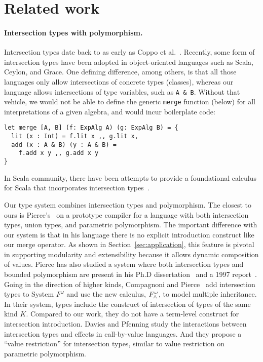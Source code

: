 \section{Related work} \label{sec:related-work}



\paragraph{Intersection types with polymorphism.}

Intersection types date back to as early as Coppo et
al.~\cite{coppo1981functional}. Recently, some form of intersection types have
been adopted in object-oriented languages such as Scala, Ceylon, and Grace. One
defining difference, among others, is that all those languages only allow
intersections of concrete types (classes), whereas our language allows
intersections of type variables, such as \texttt{A \& B}. Without that vehicle,
we would not be able to define the generic \texttt{merge} function (below) for
all interpretations of a given algebra, and would incur boilerplate code:
\begin{verbatim}
let merge [A, B] (f: ExpAlg A) (g: ExpAlg B) = {
  lit (x : Int) = f.lit x ,, g.lit x,
  add (x : A & B) (y : A & B) =
    f.add x y ,, g.add x y
}
\end{verbatim}
In Scala community, there have been attempts to provide a foundational calculus
for Scala that incorporates intersection
types~\cite{amin2014foundations,amin2012dependent}.

Our type system combines intersection types and polymorphism. The closest to
ours is Pierce's~\cite{pierce1991programming1} on a prototype compiler for a
language with both intersection types, union types, and parametric polymorphism.
The important difference with our system is that in his language there is no
explicit introduction construct like our merge operator. As shown in
Section~\ref{sec:application}, this feature is pivotal in supporting modularity
and extensibility because it allows dynamic composition of values. Pierce has
also studied a system where both intersection types and bounded polymorphism are
present in his Ph.D dissertation~\cite{pierce1991programming2} and a 1997
report~\cite{pierce1997intersection}. Going in the direction of higher kinds,
Compagnoni and Pierce~\cite{compagnoni1996higher} add intersection types to
System $ F^{\omega} $ and use the new calculus, $ F^{\omega}_{\wedge} $, to
model multiple inheritance. In their system, types include the construct of
intersection of types of the same kind $ K $. Compared to our work, they do not
have a term-level construct for intersection introduction. Davies and Pfenning
\cite{davies2000intersection} study the interactions between intersection types
and effects in call-by-value languages. And they propose a ``value restriction''
for intersection types, similar to value restriction on parametric polymorphism.

